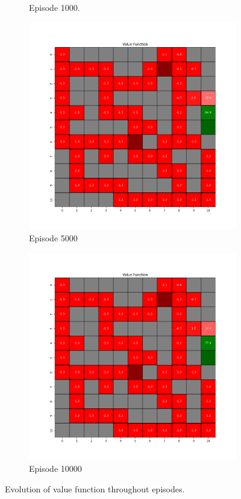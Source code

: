 \documentclass{assignment}
\begin{document}
\begin{figure}[H]
\begin{subfigure}{0.3\textwidth}
    \caption{Episode 1000.}
    \end{subfigure}\hfill
    \begin{subfigure}{0.3\textwidth}
        \includegraphics[width=\textwidth]{figures/value_q/gamma_sweep/value_function_alpha_0.1_gamma_0.25_epsilon_0.2_iteration_5000.png}
    \caption{Episode 5000}
    \end{subfigure}\hfill
    \begin{subfigure}{0.3\textwidth}
        \includegraphics[width=\textwidth]{figures/value_q/gamma_sweep/value_function_alpha_0.1_gamma_0.25_epsilon_0.2_iteration_10000.png}
    \caption{Episode 10000}
    \end{subfigure}
    \caption{Evolution of value function throughout episodes.}
    \label{fig:gamma_0.25_q_learning_value}
\end{figure}
\end{document}
